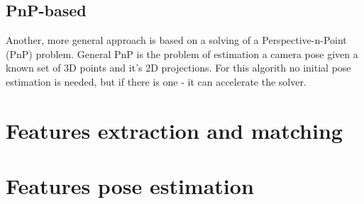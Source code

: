 \subsection{PnP-based}
Another, more general approach is based on a solving of a Perspective-n-Point (PnP) problem.
General PnP is the problem of estimation a camera pose given a known set of 3D points and it's 2D projections. 
For this algorith no initial pose estimation is needed, but if there is one - it can accelerate the solver.


\section{Features extraction and matching}

\section{Features pose estimation}

